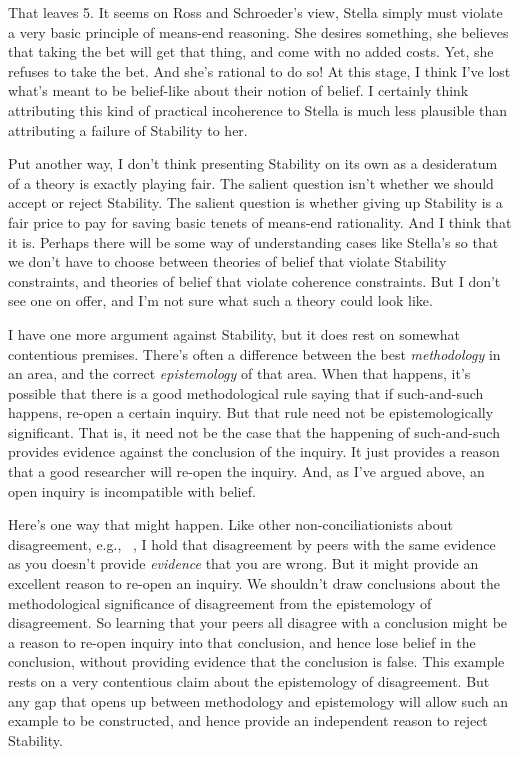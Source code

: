 \documentclass[11pt,]{book}
\begin{document}
That leaves 5. It seems on Ross and Schroeder's view, Stella simply must violate a very basic principle of means-end reasoning. She desires something, she believes that taking the bet will get that thing, and come with no added costs. Yet, she refuses to take the bet. And she's rational to do so! At this stage, I think I've lost what's meant to be belief-like about their notion of belief. I certainly think attributing this kind of practical incoherence to Stella is much less plausible than attributing a failure of Stability to her.

Put another way, I don't think presenting Stability on its own as a desideratum of a theory is exactly playing fair. The salient question isn't whether we should accept or reject Stability. The salient question is whether giving up Stability is a fair price to pay for saving basic tenets of means-end rationality. And I think that it is. Perhaps there will be some way of understanding cases like Stella's so that we don't have to choose between theories of belief that violate Stability constraints, and theories of belief that violate coherence constraints. But I don't see one on offer, and I'm not sure what such a theory could look like.

I have one more argument against Stability, but it does rest on somewhat contentious premises. There's often a difference between the best \emph{methodology} in an area, and the correct \emph{epistemology} of that area. When that happens, it's possible that there is a good methodological rule saying that if such-and-such happens, re-open a certain inquiry. But that rule need not be epistemologically significant. That is, it need not be the case that the happening of such-and-such provides evidence against the conclusion of the inquiry. It just provides a reason that a good researcher will re-open the inquiry. And, as I've argued above, an open inquiry is incompatible with belief.

Here's one way that might happen. Like other non-conciliationists about disagreement, e.g., ~\citet{Kelly2010-KELPDA}, I hold that disagreement by peers with the same evidence as you doesn't provide \emph{evidence} that you are wrong. But it might provide an excellent reason to re-open an inquiry. We shouldn't draw conclusions about the methodological significance of disagreement from the epistemology of disagreement. So learning that your peers all disagree with a conclusion might be a reason to re-open inquiry into that conclusion, and hence lose belief in the conclusion, without providing evidence that the conclusion is false. This example rests on a very contentious claim about the epistemology of disagreement. But any gap that opens up between methodology and epistemology will allow such an example to be constructed, and hence provide an independent reason to reject Stability.
\end{document}
